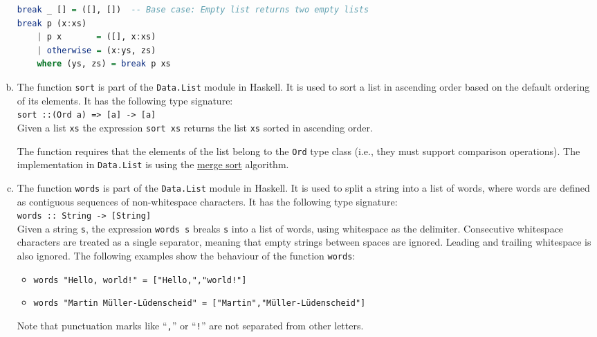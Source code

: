 \begin{enumerate}[(a)]
\begin{lstlisting}[style=haskellstyle, language=Haskell]
break _ [] = ([], [])  -- Base case: Empty list returns two empty lists
break p (x:xs)
    | p x       = ([], x:xs) 
    | otherwise = (x:ys, zs) 
    where (ys, zs) = break p xs
\end{lstlisting}
\item The function \texttt{sort} is part of the \texttt{Data.List} module in Haskell. It is used to sort a list
      in ascending order based on the default ordering of its elements.  It has the following type signature:
      \\[0.2cm]
      \hspace*{1.3cm}
      \texttt{sort ::\;(Ord a) => [a] -> [a]}
      \\[0.2cm]
      Given a list \texttt{xs} the expression \texttt{sort xs} returns the list \texttt{xs} sorted in ascending
      order.
    
      The function requires that the elements of the list belong to the \texttt{Ord} type class (i.e., they must
      support comparison operations).  The implementation in \texttt{Data.List} is using the
      \href{https://en.wikipedia.org/wiki/Merge_sort}{merge sort} algorithm.
\item The function \texttt{words} is part of the \texttt{Data.List} module in Haskell. It is used to split a
      string into a list of words, where words are defined as contiguous sequences of non-whitespace characters. 
      It has the following type signature:
      \\[0.2cm]
      \hspace*{1.3cm}
      \texttt{words :: String -> [String]}
      \\[0.2cm]
      Given a string \texttt{s}, the expression \texttt{words s} breaks \texttt{s} into a list of words, using
      whitespace as the delimiter.  Consecutive whitespace characters are treated as a single separator,
      meaning that empty strings between spaces are ignored.  Leading and trailing whitespace is also ignored.
      The following examples show the behaviour of the function \texttt{words}:
      \begin{itemize}
      \item \texttt{words "Hello, world!" = ["Hello,","world!"]}
      \item \texttt{words "Martin Müller-Lüdenscheid" = ["Martin","Müller-Lüdenscheid"]}
      \end{itemize}
      Note that punctuation marks like ``\texttt{,}'' or ``\texttt{!}'' are not separated from other letters.


\end{enumerate}
